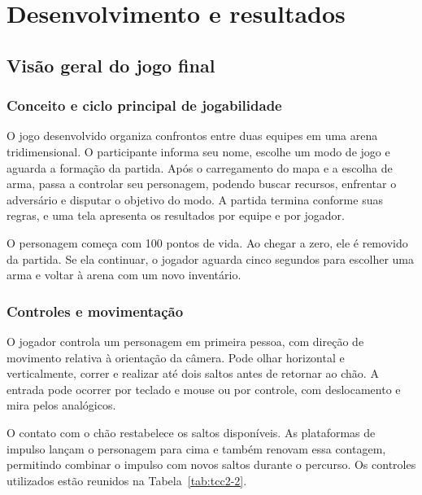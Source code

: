 \chapter{Desenvolvimento e resultados}\label{cap:tcc2-5}

\section{Visão geral do jogo final}\label{sec:5.1}

\subsection{Conceito e ciclo principal de jogabilidade}\label{sec:5.1.1}

O jogo desenvolvido organiza confrontos entre duas equipes em uma arena tridimensional. O participante informa seu nome, escolhe um modo de jogo e aguarda a formação da partida. Após o carregamento do mapa e a escolha de arma, passa a controlar seu personagem, podendo buscar recursos, enfrentar o adversário e disputar o objetivo do modo. A partida termina conforme suas regras, e uma tela apresenta os resultados por equipe e por jogador.

O personagem começa com 100 pontos de vida. Ao chegar a zero, ele é removido da partida. Se ela continuar, o jogador aguarda cinco segundos para escolher uma arma e voltar à arena com um novo inventário.

\subsection{Controles e movimentação}\label{sec:5.1.2}

O jogador controla um personagem em primeira pessoa, com direção de movimento relativa à orientação da câmera. Pode olhar horizontal e verticalmente, correr e realizar até dois saltos antes de retornar ao chão. A entrada pode ocorrer por teclado e mouse ou por controle, com deslocamento e mira pelos analógicos.

O contato com o chão restabelece os saltos disponíveis. As plataformas de impulso lançam o personagem para cima e também renovam essa contagem, permitindo combinar o impulso com novos saltos durante o percurso. Os controles utilizados estão reunidos na Tabela~\ref{tab:tcc2-2}.

